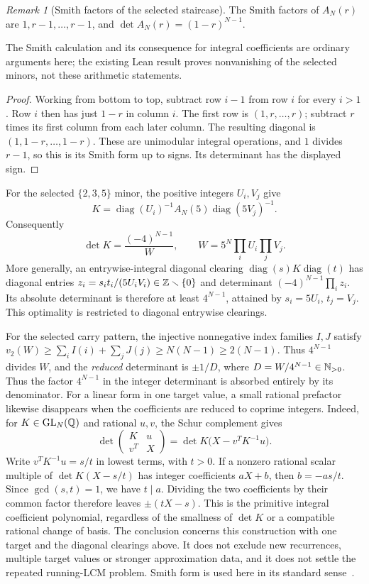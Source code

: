 \documentclass[11pt]{article}
\theoremstyle{remark}
\newtheorem{recordremark}[theorem]{Remark}
\renewenvironment{remark}[1][]{\begin{recordremark}[#1]}{\end{recordremark}}
\theoremstyle{plain}
\begin{document}
\begin{remark}[Smith factors of the selected staircase]
\label{long269:lem:staircase-smith}
The Smith factors of $A_N(r)$ are
$1,r-1,\ldots,r-1$, and
$\det A_N(r)=(1-r)^{N-1}$.
\end{remark}

The Smith calculation and its consequence for integral coefficients are
ordinary arguments here; the existing Lean result proves nonvanishing of
the selected minors, not these arithmetic statements.

\begin{proof}
Working from bottom to top, subtract row $i-1$ from row $i$ for every
$i>1$.  Row $i$ then has just $1-r$ in column $i$.  The first row is
$(1,r,\ldots,r)$; subtract $r$ times its first column from each later
column.  The resulting diagonal is $(1,1-r,\ldots,1-r)$.  These are
unimodular integral operations, and $1$ divides $r-1$, so this is its
Smith form up to signs.  Its determinant has the displayed sign.
\end{proof}

For the selected $\{2,3,5\}$ minor, the positive integers $U_i,V_j$ give
\[
 K=\operatorname{diag}(U_i)^{-1}A_N(5)\operatorname{diag}(5V_j)^{-1}.
\]
Consequently
\[
 \det K=\frac{(-4)^{N-1}}{W},\qquad
 W=5^N\prod_iU_i\prod_jV_j.
\]
More generally, an entrywise-integral diagonal clearing
$\operatorname{diag}(s)K\operatorname{diag}(t)$ has diagonal entries
$z_i=s_it_i/(5U_iV_i)\in\mathbb{Z}\smallsetminus\{0\}$ and determinant
$(-4)^{N-1}\prod_i z_i$.  Its absolute determinant is therefore at
least $4^{N-1}$, attained by $s_i=5U_i$, $t_j=V_j$.
This optimality is restricted to diagonal entrywise clearings.

For the selected carry pattern, the injective nonnegative index families
$I,J$ satisfy
$v_2(W)\ge\sum_iI(i)+\sum_jJ(j)\ge N(N-1)\ge2(N-1)$.
Thus $4^{N-1}$ divides $W$, and the \emph{reduced} determinant is
$\pm1/D$, where $D=W/4^{N-1}\in\mathbb{N}_{>0}$.
Thus the factor $4^{N-1}$ in the integer determinant is absorbed entirely
by its denominator. For a linear form in one target value, a small
rational prefactor likewise disappears when the coefficients are reduced
to coprime integers. Indeed, for $K\in\mathrm{GL}_N(\mathbb{Q})$ and rational
$u,v$, the Schur complement gives
\[
 \det\begin{pmatrix}K&u\\v^T&X\end{pmatrix}
 =\det K\bigl(X-v^TK^{-1}u\bigr).
\]
Write $v^TK^{-1}u=s/t$ in lowest terms, with $t>0$. If a nonzero
rational scalar multiple of $\det K(X-s/t)$ has integer coefficients
$aX+b$, then $b=-as/t$. Since $\gcd(s,t)=1$, we have $t\mid a$.
Dividing the two coefficients by their common factor therefore leaves
$\pm(tX-s)$. This is the primitive integral coefficient polynomial,
regardless of the smallness of $\det K$ or a compatible rational change
of basis. The conclusion concerns this construction with one target and
the diagonal clearings above. It does not exclude new recurrences,
multiple target values or stronger approximation data, and it does not
settle the repeated running-LCM problem. Smith form is
used here in its standard sense~\cite{stanley2016}.
\end{document}
